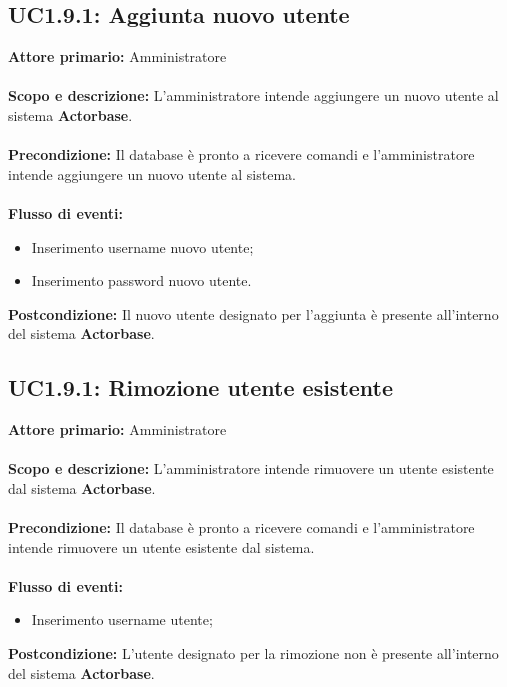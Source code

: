 \documentclass{scalatekids-article}
\begin{document}
\subsection{UC1.9.1: Aggiunta nuovo utente}
\textbf{Attore primario:} Amministratore\\ \\
\textbf{Scopo e descrizione:} L'amministratore intende aggiungere un nuovo utente al sistema \textbf{Actorbase}.\\ \\
\textbf{Precondizione:} Il database è pronto a ricevere comandi e l'amministratore intende aggiungere un nuovo utente al sistema.\\ \\
\textbf{Flusso di eventi:}
\begin{itemize}
\item Inserimento username nuovo utente;
\item Inserimento password nuovo utente.
\end{itemize}
\textbf{Postcondizione:} Il nuovo utente designato per l'aggiunta è presente all'interno del sistema \textbf{Actorbase}.
\subsection{UC1.9.1: Rimozione utente esistente}
\textbf{Attore primario:} Amministratore\\ \\
\textbf{Scopo e descrizione:} L'amministratore intende rimuovere un utente esistente dal sistema \textbf{Actorbase}.\\ \\
\textbf{Precondizione:} Il database è pronto a ricevere comandi e l'amministratore intende rimuovere un utente esistente dal sistema.\\ \\
\textbf{Flusso di eventi:}
\begin{itemize}
\item Inserimento username utente;
\end{itemize}
\textbf{Postcondizione:} L'utente designato per la rimozione non è presente all'interno del sistema \textbf{Actorbase}.
\end{document}
